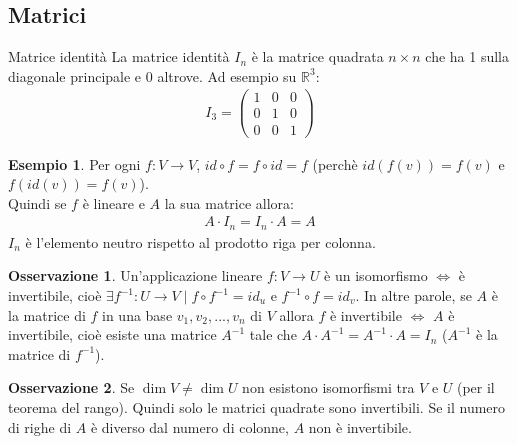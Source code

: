 \documentclass[a4paper]{article}
\theoremstyle{definition}
\newtheorem*{oss}{Osservazione}
\newtheorem*{es}{Esempio}
\begin{document}
\subsection{Matrici}
\begin{deff}{Matrice identità}{}
	La matrice identità $I_n$ è la matrice quadrata $n \times n$ che ha 1 sulla diagonale principale e 0 altrove.
	Ad esempio su $\mathbb{R}^3$:
	\begin{align*}
		I_3 = \begin{pmatrix}
			      1 & 0 & 0 \\
			      0 & 1 & 0 \\
			      0 & 0 & 1
		      \end{pmatrix}
	\end{align*}
\end{deff}
\begin{es}
	Per ogni $f: V \rightarrow V$, $id \circ f = f \circ id = f$ (perchè $id(f(v))=f(v)$ e $f(id(v))=f(v)$). \\
	Quindi se $f$ è lineare e $A$ la sua matrice allora:
	\begin{align*}
		A \cdot I_n = I_n \cdot A = A
	\end{align*}
	$I_n$ è l'elemento neutro rispetto al prodotto riga per colonna.
\end{es}
\begin{oss}
	Un'applicazione lineare $f: V \rightarrow U$ è un isomorfismo $\Leftrightarrow$ è invertibile,
	cioè $\exists f^{-1}: U \rightarrow V \mid f \circ f^{-1} = id_u$ e $f^{-1} \circ f = id_v$.
	In altre parole, se $A$ è la matrice di $f$ in una base $v_1, v_2, ..., v_n$ di $V$ allora $f$ è invertibile $\Leftrightarrow$ $A$ è invertibile,
	cioè esiste una matrice $A^{-1}$ tale che $A \cdot A^{-1} = A^{-1} \cdot A = I_n$ ($A^{-1}$ è la matrice di $f^{-1}$).
\end{oss}
\begin{oss}
	Se $\dim V \neq \dim U$ non esistono isomorfismi tra $V$ e $U$ (per il teorema del rango). Quindi solo le matrici quadrate sono invertibili.
	Se il numero di righe di $A$ è diverso dal numero di colonne, $A$ non è invertibile.
\end{oss}
\end{document}
